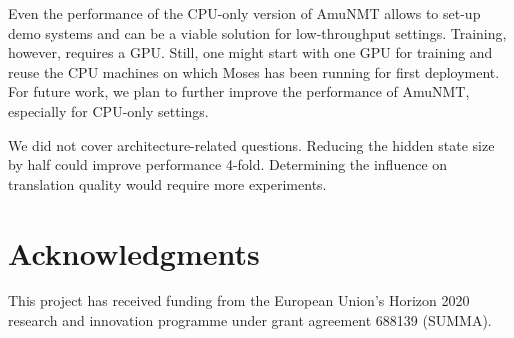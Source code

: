 \documentclass[11pt]{article}
\begin{document}
Even the performance of the CPU-only version of AmuNMT allows to set-up demo systems and can be a viable solution for low-throughput settings. Training, however, requires a GPU. Still, one might start with one GPU for training and reuse the CPU machines on which Moses has been running  for first deployment. For future work, we plan to further improve the performance of AmuNMT, especially for CPU-only settings.

We did not cover architecture-related questions. Reducing the hidden state size by half could improve performance 4-fold. Determining the influence on translation quality would require more experiments.

\section{Acknowledgments}
This project has received funding from the European Union's Horizon 2020 research and innovation
programme under grant agreement 688139 (SUMMA).




\end{document}
